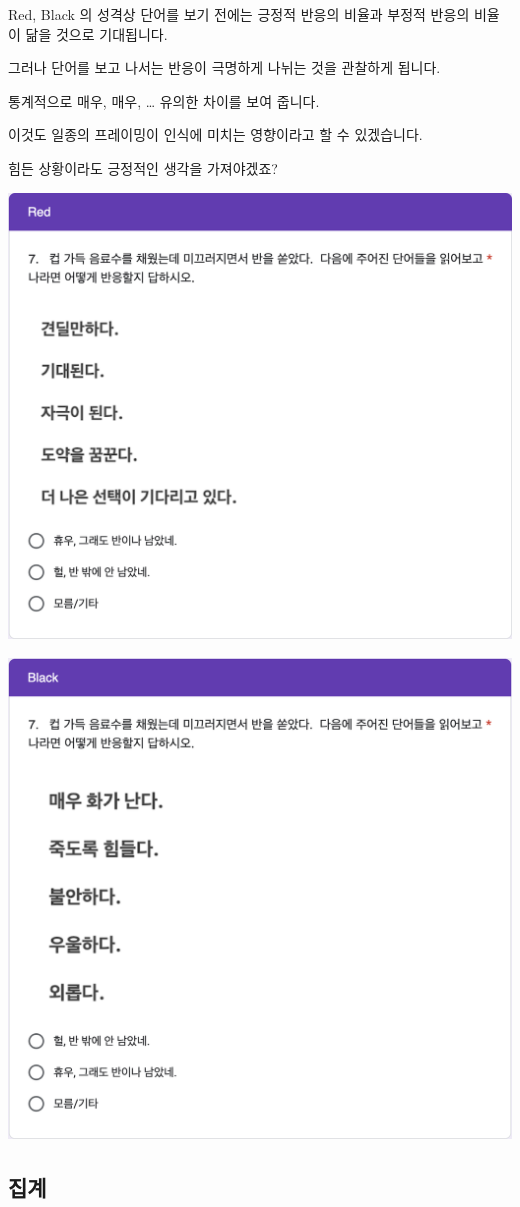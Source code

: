 \documentclass[
]{book}
\begin{document}
Red, Black 의 성격상 단어를 보기 전에는 긍정적 반응의 비율과 부정적 반응의 비율이 닮을 것으로 기대됩니다.

그러나 단어를 보고 나서는 반응이 극명하게 나뉘는 것을 관찰하게 됩니다.

통계적으로 매우, 매우, \ldots{} 유의한 차이를 보여 줍니다.

이것도 일종의 프레이밍이 인식에 미치는 영향이라고 할 수 있겠습니다.

힘든 상황이라도 긍정적인 생각을 가져야겠죠?

\begin{flushleft}\includegraphics[width=0.67\linewidth]{./pics/Quiz240329_Q7_Red} \end{flushleft}

\begin{flushleft}\includegraphics[width=0.67\linewidth]{./pics/Quiz240329_Q7_Black} \end{flushleft}

\subsection{집계}\label{uxc9d1uxacc4-5}
\end{document}
